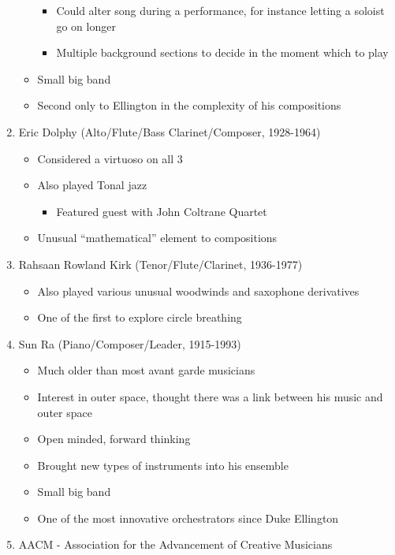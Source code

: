 \documentclass[]{article}
\providecommand{\tightlist}{%
  \setlength{\itemsep}{0pt}\setlength{\parskip}{0pt}}
\begin{document}
\begin{enumerate}
\begin{itemize}
    \begin{itemize}
    \tightlist
    \item
      Could alter song during a performance, for instance letting a
      soloist go on longer
    \item
      Multiple background sections to decide in the moment which to play
    \end{itemize}
  \item
    Small big band
  \item
    Second only to Ellington in the complexity of his compositions
  \end{itemize}
\item
  Eric Dolphy (Alto/Flute/Bass Clarinet/Composer, 1928-1964)

  \begin{itemize}
  \tightlist
  \item
    Considered a virtuoso on all 3
  \item
    Also played Tonal jazz

    \begin{itemize}
    \tightlist
    \item
      Featured guest with John Coltrane Quartet
    \end{itemize}
  \item
    Unusual ``mathematical'' element to compositions
  \end{itemize}
\item
  Rahsaan Rowland Kirk (Tenor/Flute/Clarinet, 1936-1977)

  \begin{itemize}
  \tightlist
  \item
    Also played various unusual woodwinds and saxophone derivatives
  \item
    One of the first to explore circle breathing
  \end{itemize}
\item
  Sun Ra (Piano/Composer/Leader, 1915-1993)

  \begin{itemize}
  \tightlist
  \item
    Much older than most avant garde musicians
  \item
    Interest in outer space, thought there was a link between his music
    and outer space
  \item
    Open minded, forward thinking
  \item
    Brought new types of instruments into his ensemble
  \item
    Small big band
  \item
    One of the most innovative orchestrators since Duke Ellington
  \end{itemize}
\item
  AACM - Association for the Advancement of Creative Musicians


\end{enumerate}
\end{document}
